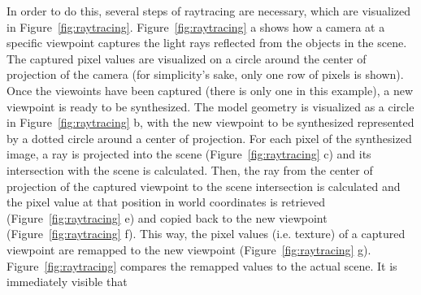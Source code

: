In order to do this, several steps of raytracing are necessary, which are visualized in Figure~\ref{fig:raytracing}. Figure~\ref{fig:raytracing} a shows how a camera at a specific viewpoint captures the light rays reflected from the objects in the scene. The captured pixel values are visualized on a circle around the center of projection of the camera (for simplicity's sake, only one row of pixels is shown). Once the viewoints have been captured (there is only one in this example), a new viewpoint is ready to be synthesized. The model geometry is visualized as a circle in Figure~\ref{fig:raytracing} b, with the new viewpoint to be synthesized represented by a dotted circle around a center of projection. For each pixel of the synthesized image, a ray is projected into the scene (Figure~\ref{fig:raytracing} c) and its intersection with the scene is calculated. Then, the ray from the center of projection of the captured viewpoint to the scene intersection is calculated and the pixel value at that position in world coordinates is retrieved (Figure~\ref{fig:raytracing} e) and copied back to the new viewpoint (Figure~\ref{fig:raytracing} f). This way, the pixel values (i.e. texture) of a captured viewpoint are remapped to the new viewpoint (Figure~\ref{fig:raytracing} g). Figure~\ref{fig:raytracing} compares the remapped values to the actual scene. It is immediately visible that

